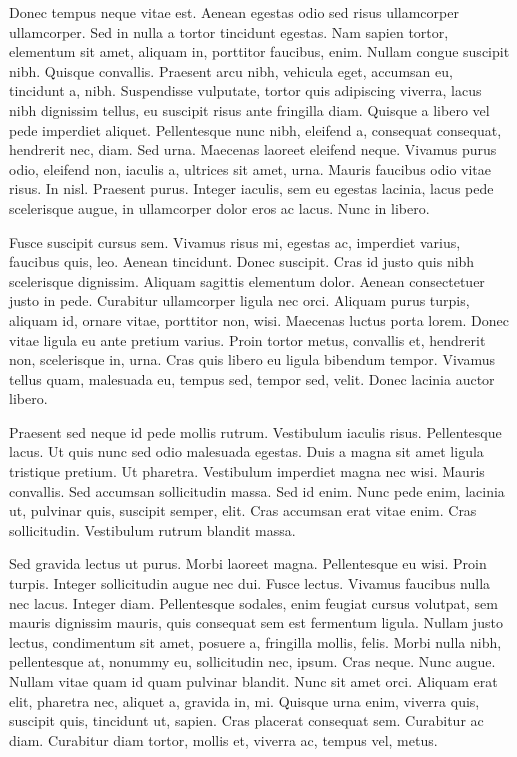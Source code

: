 \documentclass{article}
\begin{document}
Donec tempus neque vitae est. Aenean egestas odio sed risus ullamcorper
ullamcorper. Sed in nulla a tortor tincidunt egestas. Nam sapien tortor,
elementum sit amet, aliquam in, porttitor faucibus, enim. Nullam congue
suscipit nibh. Quisque convallis. Praesent arcu nibh, vehicula eget, accumsan
eu, tincidunt a, nibh. Suspendisse vulputate, tortor quis adipiscing viverra,
lacus nibh dignissim tellus, eu suscipit risus ante fringilla diam. Quisque a
libero vel pede imperdiet aliquet. Pellentesque nunc nibh, eleifend a,
consequat consequat, hendrerit nec, diam. Sed urna. Maecenas laoreet eleifend
neque. Vivamus purus odio, eleifend non, iaculis a, ultrices sit amet, urna.
Mauris faucibus odio vitae risus. In nisl. Praesent purus. Integer iaculis, sem
eu egestas lacinia, lacus pede scelerisque augue, in ullamcorper dolor eros ac
lacus. Nunc in libero.

Fusce suscipit cursus sem. Vivamus risus mi, egestas ac, imperdiet varius,
faucibus quis, leo. Aenean tincidunt. Donec suscipit. Cras id justo quis nibh
scelerisque dignissim. Aliquam sagittis elementum dolor. Aenean consectetuer
justo in pede. Curabitur ullamcorper ligula nec orci. Aliquam purus turpis,
aliquam id, ornare vitae, porttitor non, wisi. Maecenas luctus porta lorem.
Donec vitae ligula eu ante pretium varius. Proin tortor metus, convallis et,
hendrerit non, scelerisque in, urna. Cras quis libero eu ligula bibendum
tempor. Vivamus tellus quam, malesuada eu, tempus sed, tempor sed, velit. Donec
lacinia auctor libero.

Praesent sed neque id pede mollis rutrum. Vestibulum iaculis risus.
Pellentesque lacus. Ut quis nunc sed odio malesuada egestas. Duis a magna sit
amet ligula tristique pretium. Ut pharetra. Vestibulum imperdiet magna nec
wisi. Mauris convallis. Sed accumsan sollicitudin massa. Sed id enim. Nunc pede
enim, lacinia ut, pulvinar quis, suscipit semper, elit. Cras accumsan erat
vitae enim. Cras sollicitudin. Vestibulum rutrum blandit massa.

Sed gravida lectus ut purus. Morbi laoreet magna. Pellentesque eu wisi.
Proin turpis. Integer sollicitudin augue nec dui. Fusce lectus. Vivamus
faucibus nulla nec lacus. Integer diam. Pellentesque sodales, enim feugiat
cursus volutpat, sem mauris dignissim mauris, quis consequat sem est fermentum
ligula. Nullam justo lectus, condimentum sit amet, posuere a, fringilla mollis,
felis. Morbi nulla nibh, pellentesque at, nonummy eu, sollicitudin nec, ipsum.
Cras neque. Nunc augue. Nullam vitae quam id quam pulvinar blandit. Nunc sit
amet orci. Aliquam erat elit, pharetra nec, aliquet a, gravida in, mi. Quisque
urna enim, viverra quis, suscipit quis, tincidunt ut, sapien. Cras placerat
consequat sem. Curabitur ac diam. Curabitur diam tortor, mollis et, viverra ac,
tempus vel, metus.
\end{document}

